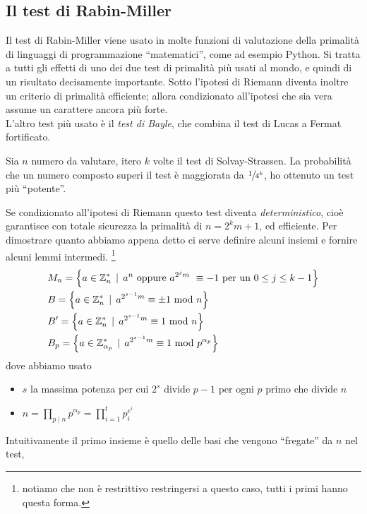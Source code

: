 \subsection{Il test di Rabin-Miller}
Il test di Rabin-Miller viene usato in molte funzioni di valutazione della primalità di linguaggi di programmazione \enquote{matematici}, come ad esempio Python. Si tratta a tutti gli effetti di uno dei due test di primalità più usati al mondo, e quindi di un risultato decisamente importante. Sotto l'ipotesi di Riemann diventa inoltre un criterio di primalità efficiente; allora condizionato all'ipotesi che sia vera assume un carattere ancora più forte. \\ L'altro test più usato è il \textit{test di Bayle}, che combina il test di Lucas a Fermat fortificato.
\begin{teorema}
	Sia $n$ numero da valutare, itero $k$ volte il test di Solvay-Strassen. La probabilità che un numero composto superi il test è maggiorata da $\sfrac{1}{4^k}$, ho ottenuto un test più \enquote{potente}.
\end{teorema}
\begin{osservazione}
	Se condizionato all'ipotesi di Riemann questo test diventa \textit{deterministico}, cioè garantisce con totale sicurezza la primalità di $n=2^km+1$, ed efficiente. Per dimostrare quanto abbiamo appena detto ci serve definire alcuni insiemi e fornire alcuni lemmi intermedi. \footnote{notiamo che non è restrittivo restringersi a questo caso, tutti i primi hanno questa forma.}
	\begin{align*}
	&M_n=\left\{a\in\mathbb{Z}_n^* \, \mid \, a^n \ \text{oppure} \ a^{2^jm} \ \equiv-1 \ \text{per un $0\leq j\leq k-1$}\right\}\\
	&B=\left\{a\in\mathbb{Z}_n^* \, \mid \, a^{2^{s-1}m}\equiv\pm1\Mod n\right\}\\
	&B'=\left\{a\in\mathbb{Z}_n^*\, \mid \,a^{2^{s-1}m}\equiv1\Mod n \right\}\\
	&B_p=\left\{a\in\mathbb{Z}_{\alpha_p}^*\, \mid \, a^{2^{s-1}m}\equiv1\Mod p^{\alpha_p}\right\}
	\end{align*}
	dove abbiamo usato
	\begin{itemize}
		\item $s$ la massima potenza per cui $2^s$ divide $p-1$ per ogni $p$ primo che divide $n$
		\item $n=\prod_{p\mid n}p^{\alpha_p}=\prod_{i=1}^tp_i^{e^i}$
	\end{itemize}
	Intuitivamente il primo insieme è quello delle basi che vengono \enquote{fregate} da $n$ nel test, 
\end{osservazione}
